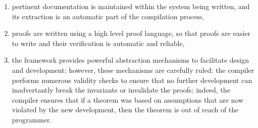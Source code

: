 \begin{enumerate}
\item pertinent documentation is maintained within the system being written,
      and its extraction is an automatic part of the compilation process,
\item proofs are written using a high level proof language, so that proofs
      are easier to write and their verification is automatic and reliable,
\item the framework provides powerful abstraction mechanisms to facilitate
      design and development; however, these mechanisms are carefully ruled:
      the compiler performs numerous validity checks to ensure that no
      further development can inadvertantly break the invariants or
      invalidate the proofs; indeed, the compiler ensures that if a theorem
      was based on assumptions that are now violated by the new development,
      then the theorem is out of reach of the programmer.
\end{enumerate}




